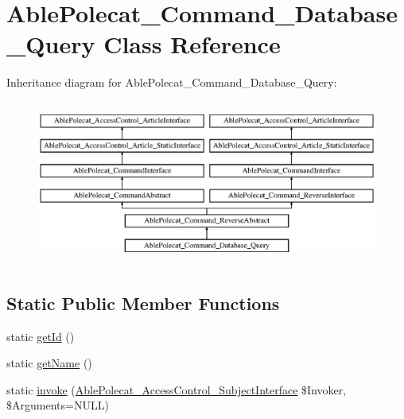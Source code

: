 \hypertarget{class_able_polecat___command___database___query}{}\section{Able\+Polecat\+\_\+\+Command\+\_\+\+Database\+\_\+\+Query Class Reference}
\label{class_able_polecat___command___database___query}
Inheritance diagram for Able\+Polecat\+\_\+\+Command\+\_\+\+Database\+\_\+\+Query\+:\begin{figure}[H]
\begin{center}
\leavevmode
\includegraphics[height=5.419355cm]{class_able_polecat___command___database___query}
\end{center}
\end{figure}
\subsection*{Static Public Member Functions}
\begin{DoxyCompactItemize}
\item 
static \hyperlink{class_able_polecat___command___database___query_acfaa3a96d0cb5a4c0d4d710dcba41e9e}{get\+Id} ()
\item 
static \hyperlink{class_able_polecat___command___database___query_a4ef9bd37ba3ce8a13c1e8bcf4f72a630}{get\+Name} ()
\item 
static \hyperlink{class_able_polecat___command___database___query_a6821480fe527af0afdf3691d7cffad5f}{invoke} (\hyperlink{interface_able_polecat___access_control___subject_interface}{Able\+Polecat\+\_\+\+Access\+Control\+\_\+\+Subject\+Interface} \$Invoker, \$Arguments=N\+U\+L\+L)
\end{DoxyCompactItemize}
